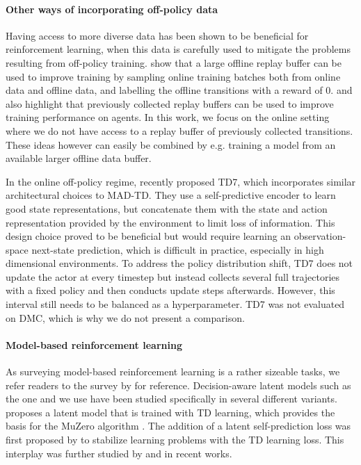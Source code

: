 \paragraph{Other ways of incorporating off-policy data} Having access to more diverse data has been shown to be beneficial for reinforcement learning, when this data is carefully used to mitigate the problems resulting from off-policy training.
\textcite{ball2023efficient} show that a large offline replay buffer can be used to improve training by sampling online training batches both from online data and offline data, and labelling the offline transitions with a reward of 0.
\textcite{agarwal2022reincarnating} and \textcite{tirumala2024replay} also highlight that previously collected replay buffers can be used to improve training performance on agents.
In this work, we focus on the online setting where we do not have access to a replay buffer of previously collected transitions.
These ideas however can easily be combined by e.g. training a model from an available larger offline data buffer.


In the online off-policy regime, \textcite{fujimoto2024sale} recently proposed TD7, which incorporates similar architectural choices to MAD-TD.
They use a self-predictive encoder to learn good state representations, but concatenate them with the state and action representation provided by the environment to limit loss of information.
This design choice proved to be beneficial but would require learning an observation-space next-state prediction, which is difficult in practice, especially in high dimensional environments.
To address the policy distribution shift, TD7 does not update the actor at every timestep but instead collects several full trajectories with a fixed policy and then conducts update steps afterwards.
However, this interval still needs to be balanced as a hyperparameter.
TD7 was not evaluated on DMC, which is why we do not present a comparison.


\paragraph{Model-based reinforcement learning} As surveying model-based reinforcement learning is a rather sizeable tasks, we refer readers to the survey by \textcite{moerland} for reference.
Decision-aware latent models such as the one \textcite{hansen2024tdmpc} and we use have been studied specifically in several different variants.
\textcite{silver2017predictron} proposes a latent model that is trained with TD learning, which provides the basis for the MuZero algorithm \parencite{schrittwieser2020mastering}.
The addition of a latent self-prediction loss was first proposed by \textcite{li2023efficient} to stabilize learning problems with the TD learning loss.
This interplay was further studied by \textcite{ni2024bridging} and \textcite{voelcker2024when} in recent works.


